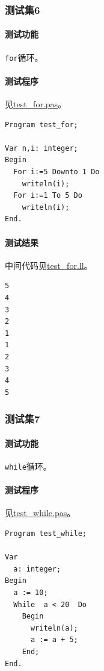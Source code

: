 \documentclass[lang=cn,11pt,a4paper,cite=authornum]{paper}
\begin{document}
\subsubsection{测试集6}

\paragraph{测试功能} \texttt{for}循环。

\paragraph{测试程序} 见\href{run:../test/test_for.pas}{test\_for.pas}。

\begin{code}
    \begin{verbatim}
Program test_for;

Var n,i: integer;
Begin
  For i:=5 Downto 1 Do
    writeln(i);
  For i:=1 To 5 Do
    writeln(i);
End.
\end{verbatim}
\end{code}

\paragraph{测试结果} 中间代码见\href{run:../test/test_for.ll}{test\_for.ll}。

\begin{code}
    \begin{verbatim}
5
4
3
2
1
1
2
3
4
5
\end{verbatim}
\end{code}

\subsubsection{测试集7}

\paragraph{测试功能} \texttt{while}循环。

\paragraph{测试程序} 见\href{run:../test/test_while.pas}{test\_while.pas}。

\begin{code}
    \begin{verbatim}
Program test_while;

Var 
  a: integer;
Begin
  a := 10;
  While  a < 20  Do
    Begin
      writeln(a);
      a := a + 5;
    End;
End.
\end{verbatim}
\end{code}
\end{document}
